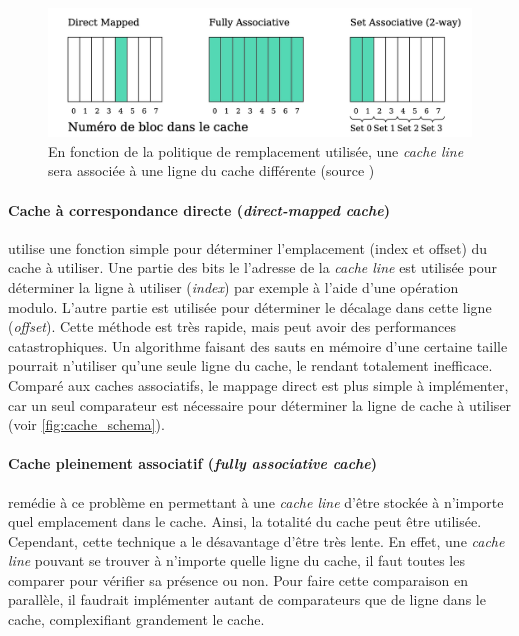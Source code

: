 \begin{figure}
    \center
    \includegraphics[width=12cm]{images/cache_associativite.png}
    \caption{\label{pic:cache_associativite} En fonction de la politique de remplacement utilisée, une \textit{cache line} sera associée à une ligne du cache différente (source \cite{Meunier2017})}
\end{figure}

\paragraph{Cache à correspondance directe (\textit{direct-mapped cache})} utilise une fonction simple pour déterminer l'emplacement (index et offset) du cache à utiliser. Une partie des bits le l'adresse de la \textit{cache line} est utilisée pour déterminer la ligne à utiliser (\textit{index}) par exemple à l'aide d'une opération modulo. L'autre partie est utilisée pour déterminer le décalage dans cette ligne (\textit{offset}). Cette méthode est très rapide, mais peut avoir des performances catastrophiques. Un algorithme faisant des sauts en mémoire d'une certaine taille pourrait n'utiliser qu'une seule ligne du cache, le rendant totalement inefficace. Comparé aux caches associatifs, le mappage direct est plus simple à implémenter, car un seul comparateur est nécessaire pour déterminer la ligne de cache à utiliser (voir \autoref{fig:cache_schema}).

\paragraph{Cache pleinement associatif (\textit{fully associative cache})} remédie à ce problème en permettant à une \textit{cache line} d'être stockée à n'importe quel emplacement dans le cache. Ainsi, la totalité du cache peut être utilisée. Cependant, cette technique a le désavantage d'être très lente. En effet, une \textit{cache line} pouvant se trouver à n'importe quelle ligne du cache, il faut toutes les comparer pour vérifier sa présence ou non. Pour faire cette comparaison en parallèle, il faudrait implémenter autant de comparateurs que de ligne dans le cache, complexifiant grandement le cache.

